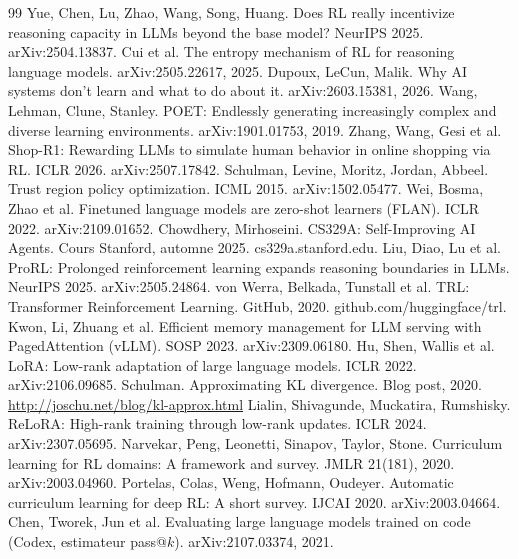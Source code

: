 \documentclass[11pt,a4paper]{article}
\begin{document}
\begin{thebibliography}{99}
 Yue, Chen, Lu, Zhao, Wang, Song, Huang. Does RL really incentivize reasoning capacity in LLMs beyond the base model? NeurIPS 2025. arXiv:2504.13837.
 Cui et al. The entropy mechanism of RL for reasoning language models. arXiv:2505.22617, 2025.
 Dupoux, LeCun, Malik. Why AI systems don't learn and what to do about it. arXiv:2603.15381, 2026.
 Wang, Lehman, Clune, Stanley. POET: Endlessly generating increasingly complex and diverse learning environments. arXiv:1901.01753, 2019.
 Zhang, Wang, Gesi et al. Shop-R1: Rewarding LLMs to simulate human behavior in online shopping via RL. ICLR 2026. arXiv:2507.17842.
 Schulman, Levine, Moritz, Jordan, Abbeel. Trust region policy optimization. ICML 2015. arXiv:1502.05477.
 Wei, Bosma, Zhao et al. Finetuned language models are zero-shot learners (FLAN). ICLR 2022. arXiv:2109.01652.
 Chowdhery, Mirhoseini. CS329A: Self-Improving AI Agents. Cours Stanford, automne 2025. cs329a.stanford.edu.
 Liu, Diao, Lu et al. ProRL: Prolonged reinforcement learning expands reasoning boundaries in LLMs. NeurIPS 2025. arXiv:2505.24864.
 von Werra, Belkada, Tunstall et al. TRL: Transformer Reinforcement Learning. GitHub, 2020. github.com/huggingface/trl.
 Kwon, Li, Zhuang et al. Efficient memory management for LLM serving with PagedAttention (vLLM). SOSP 2023. arXiv:2309.06180.
 Hu, Shen, Wallis et al. LoRA: Low-rank adaptation of large language models. ICLR 2022. arXiv:2106.09685.
 Schulman. Approximating KL divergence. Blog post, 2020. \url{http://joschu.net/blog/kl-approx.html}
 Lialin, Shivagunde, Muckatira, Rumshisky. ReLoRA: High-rank training through low-rank updates. ICLR 2024. arXiv:2307.05695.
 Narvekar, Peng, Leonetti, Sinapov, Taylor, Stone. Curriculum learning for RL domains: A framework and survey. JMLR 21(181), 2020. arXiv:2003.04960.
 Portelas, Colas, Weng, Hofmann, Oudeyer. Automatic curriculum learning for deep RL: A short survey. IJCAI 2020. arXiv:2003.04664.
 Chen, Tworek, Jun et al. Evaluating large language models trained on code (Codex, estimateur pass@$k$). arXiv:2107.03374, 2021.
\end{thebibliography}
\end{document}
